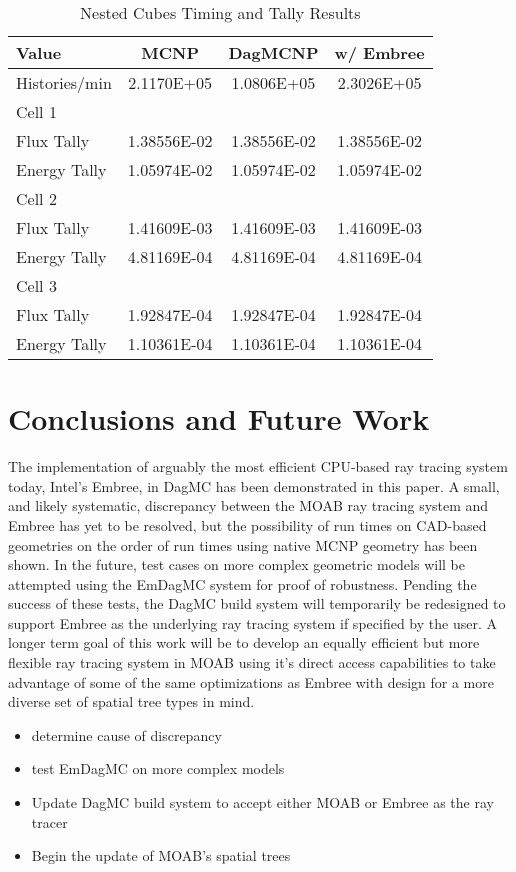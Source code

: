 \documentclass{anstrans}
\begin{document}
\begin{table}[H]

  \begin{center}
    \caption{Nested Cubes Timing and Tally Results}
    
    \begin{tabular}{lccc}
      \toprule
      Value & MCNP & DagMCNP & w/ Embree \\
      \toprule
      Histories/min & 2.1170E+05 & 1.0806E+05 & 2.3026E+05 \\
      \hline
      Cell 1 & & & \\
      Flux Tally & 1.38556E-02 & 1.38556E-02 & 1.38556E-02 \\
      Energy Tally & 1.05974E-02 & 1.05974E-02 & 1.05974E-02 \\
      \hline
      Cell 2 & & & \\
      Flux Tally & 1.41609E-03 & 1.41609E-03 & 1.41609E-03 \\
      Energy Tally & 4.81169E-04 & 4.81169E-04 & 4.81169E-04 \\
      \hline
      Cell 3 & & & \\
      Flux Tally & 1.92847E-04 & 1.92847E-04 & 1.92847E-04 \\
      Energy Tally & 1.10361E-04 & 1.10361E-04 & 1.10361E-04 \\
      \bottomrule
      
                        
    \end{tabular}


  \end{center}

\end{table}

\section{Conclusions and Future Work}

The implementation of arguably the most efficient CPU-based ray tracing system today, Intel's Embree, in DagMC has been demonstrated in this paper. A small, and likely systematic, discrepancy between the MOAB ray tracing system and Embree has yet to be resolved, but the possibility of run times on CAD-based geometries on the order of run times using native MCNP geometry has been shown.
In the future, test cases on more complex geometric models will be attempted using the EmDagMC system for proof of robustness. Pending the success of these tests, the DagMC build system will temporarily be redesigned to support Embree as the underlying ray tracing system if specified by the user. A longer term goal of this work will be to develop an equally efficient but more flexible ray tracing system in MOAB using it's direct access capabilities to take advantage of some of the same optimizations as Embree with design for a more diverse set of spatial tree types in mind. 


\begin{itemize}

\item determine cause of discrepancy
\item test EmDagMC on more complex models
\item Update DagMC build system to accept either MOAB or Embree as the ray tracer
\item Begin the update of MOAB's spatial trees

\end{itemize}




\end{document}
